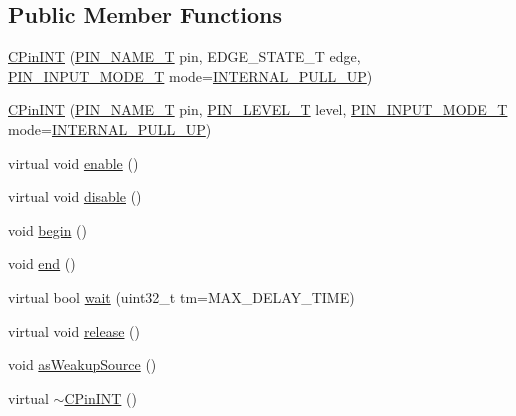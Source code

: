 \subsection*{Public Member Functions}
\begin{DoxyCompactItemize}
\item 
\hyperlink{class_c_pin_i_n_t_a71f5452b1d99597b04082bf402f4ae59}{C\-Pin\-I\-N\-T} (\hyperlink{group___peripheral_ga65a2241721e4acb573e0c3fe29ac432f}{P\-I\-N\-\_\-\-N\-A\-M\-E\-\_\-\-T} pin, E\-D\-G\-E\-\_\-\-S\-T\-A\-T\-E\-\_\-\-T edge, \hyperlink{group___peripheral_gad5705547b72a4480dc714447b3bbfb64}{P\-I\-N\-\_\-\-I\-N\-P\-U\-T\-\_\-\-M\-O\-D\-E\-\_\-\-T} mode=\hyperlink{group___peripheral_gga16ce6180d8bb2eb23a7df8f8923ea581a781a7f23ae9b0dbdc6edfdcfd3be75df}{I\-N\-T\-E\-R\-N\-A\-L\-\_\-\-P\-U\-L\-L\-\_\-\-U\-P})
\item 
\hyperlink{class_c_pin_i_n_t_a48e6afdca1e70de51e292d1d3c4bafc5}{C\-Pin\-I\-N\-T} (\hyperlink{group___peripheral_ga65a2241721e4acb573e0c3fe29ac432f}{P\-I\-N\-\_\-\-N\-A\-M\-E\-\_\-\-T} pin, \hyperlink{group___peripheral_gac4a9005971c102914017b5e21ae23a19}{P\-I\-N\-\_\-\-L\-E\-V\-E\-L\-\_\-\-T} level, \hyperlink{group___peripheral_gad5705547b72a4480dc714447b3bbfb64}{P\-I\-N\-\_\-\-I\-N\-P\-U\-T\-\_\-\-M\-O\-D\-E\-\_\-\-T} mode=\hyperlink{group___peripheral_gga16ce6180d8bb2eb23a7df8f8923ea581a781a7f23ae9b0dbdc6edfdcfd3be75df}{I\-N\-T\-E\-R\-N\-A\-L\-\_\-\-P\-U\-L\-L\-\_\-\-U\-P})
\item 
virtual void \hyperlink{class_c_pin_i_n_t_a36d2301b10290741be6d3dd86dbc534b}{enable} ()
\item 
virtual void \hyperlink{class_c_pin_i_n_t_a08521d6d6892b7a80452bfce7db03e2b}{disable} ()
\item 
void \hyperlink{class_c_pin_i_n_t_a811526191ebf7ba17f0f51dea004d37b}{begin} ()
\item 
void \hyperlink{class_c_pin_i_n_t_a9f65ac4a7485b63e46b232f8d7ab385f}{end} ()
\item 
virtual bool \hyperlink{class_c_pin_i_n_t_a45e9fb4b6e6300e4c1c2ed6c13cfc062}{wait} (uint32\-\_\-t tm=M\-A\-X\-\_\-\-D\-E\-L\-A\-Y\-\_\-\-T\-I\-M\-E)
\item 
virtual void \hyperlink{class_c_pin_i_n_t_abe0ce7ac090423e11d460e75c8838128}{release} ()
\item 
void \hyperlink{class_c_pin_i_n_t_ae30634b8f9107d2ce4b6c3a52aeb380a}{as\-Weakup\-Source} ()
\item 
virtual \hyperlink{class_c_pin_i_n_t_ab75df389802ed381ac35726196ee15bb}{$\sim$\-C\-Pin\-I\-N\-T} ()
\end{DoxyCompactItemize}
